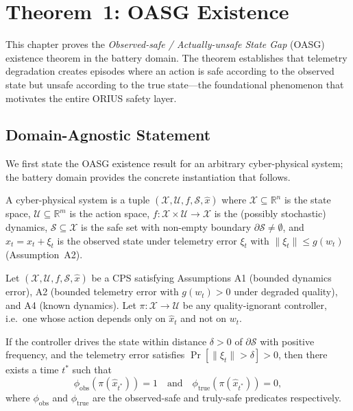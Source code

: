 
\chapter{Theorem~1: OASG Existence}
\label{ch:theorem-oasg}

This chapter proves the \emph{Observed-safe / Actually-unsafe State Gap}
(OASG) existence theorem in the battery domain.  The theorem
establishes that telemetry degradation creates episodes where an action
is safe according to the observed state but unsafe according to the
true state---the foundational phenomenon that motivates the entire
ORIUS safety layer.

\section{Domain-Agnostic Statement}

We first state the OASG existence result for an arbitrary cyber-physical
system; the battery domain provides the concrete instantiation that follows.

\begin{definition}
\label{def:abstract-cps}
A cyber-physical system is a tuple
$(\mathcal{X}, \mathcal{U}, f, \mathcal{S}, \hat{x})$ where
$\mathcal{X} \subseteq \mathbb{R}^n$ is the state space,
$\mathcal{U} \subseteq \mathbb{R}^m$ is the action space,
$f : \mathcal{X} \times \mathcal{U} \to \mathcal{X}$ is the (possibly
stochastic) dynamics, $\mathcal{S} \subseteq \mathcal{X}$ is the safe
set with non-empty boundary $\partial \mathcal{S} \neq \emptyset$, and
$\hat{x}_t = x_t + \xi_t$ is the observed state under telemetry error
$\xi_t$ with $\|\xi_t\| \le g(w_t)$ (Assumption~A2).
\end{definition}

\begin{theorem}
\label{thm:oasg-general}
Let $(\mathcal{X}, \mathcal{U}, f, \mathcal{S}, \hat{x})$ be a CPS
satisfying Assumptions A1 (bounded dynamics error), A2 (bounded telemetry
error with $g(w_t) > 0$ under degraded quality), and A4 (known dynamics).
Let $\pi : \mathcal{X} \to \mathcal{U}$ be any quality-ignorant controller,
i.e.\ one whose action depends only on $\hat{x}_t$ and not on $w_t$.

If the controller drives the state within distance
$\delta > 0$ of $\partial \mathcal{S}$ with positive frequency, and the
telemetry error satisfies $\Pr[\|\xi_t\| > \delta] > 0$, then there
exists a time $t^*$ such that
\[
  \phi_{\text{obs}}(\pi(\hat{x}_{t^*})) = 1
  \quad\text{and}\quad
  \phi_{\text{true}}(\pi(\hat{x}_{t^*})) = 0,
\]
where $\phi_{\text{obs}}$ and $\phi_{\text{true}}$ are the observed-safe
and truly-safe predicates respectively.
\end{theorem}

